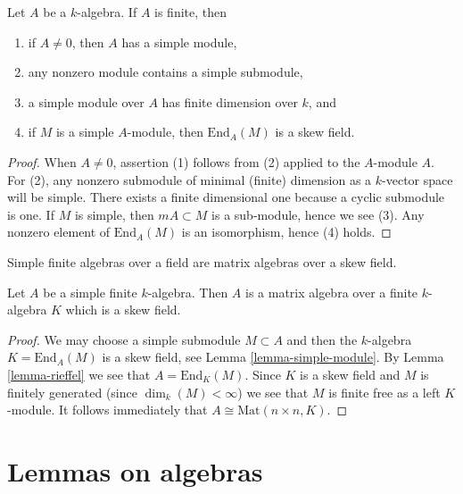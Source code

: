 \begin{lemma}
\label{lemma-simple-module}
Let $A$ be a $k$-algebra. If $A$ is finite, then
\begin{enumerate}
\item if $A \not = 0$, then $A$ has a simple module,
\item any nonzero module contains a simple submodule,
\item a simple module over $A$ has finite dimension over $k$, and
\item if $M$ is a simple $A$-module, then $\text{End}_A(M)$ is a
skew field.
\end{enumerate}
\end{lemma}

\begin{proof}
When $A \not = 0$, assertion (1) follows from (2) applied to the $A$-module $A$.
For (2), any nonzero submodule of minimal (finite) dimension as a $k$-vector
space will be simple. There exists a finite dimensional one
because a cyclic submodule is one. If $M$ is simple, then
$mA \subset M$ is a sub-module, hence we see (3). Any nonzero element
of $\text{End}_A(M)$ is an isomorphism, hence (4) holds.
\end{proof}

\begin{theorem}
\label{theorem-wedderburn}
\begin{slogan}
Simple finite algebras over a field are matrix algebras over a skew field.
\end{slogan}
Let $A$ be a simple finite $k$-algebra. Then $A$ is a matrix algebra over
a finite $k$-algebra $K$ which is a skew field.
\end{theorem}

\begin{proof}
We may choose a simple submodule $M \subset A$ and then
the $k$-algebra $K = \text{End}_A(M)$ is a skew field, see
Lemma \ref{lemma-simple-module}.
By
Lemma \ref{lemma-rieffel}
we see that $A = \text{End}_K(M)$. Since $K$ is a skew field and
$M$ is finitely generated (since $\dim_k(M) < \infty$) we see that
$M$ is finite free as a left $K$-module. It follows immediately that
$A \cong \text{Mat}(n \times n, K)$.
\end{proof}






\section{Lemmas on algebras}
\label{section-lemmas}

